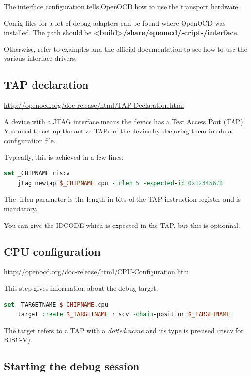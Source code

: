 \documentclass{article}
\begin{document}
    The interface configuration tells OpenOCD how to use the transport hardware. 
    
    Config files for a lot of debug adapters can be found where OpenOCD was installed. The path should be \textbf{<build>/share/openocd/scripts/interface}.
    
    Otherwise, refer to examples and the official documentation to see how to use the various interface drivers.
    
    \subsection{TAP declaration}
    
    \url{http://openocd.org/doc-release/html/TAP-Declaration.html}
    
    A device with a JTAG interface means the device has a Test Access Port (TAP). You need to set up the active TAPs of the device by declaring them inside a configuration file.
    
    Typically, this is achieved in a few lines:
    
    \begin{lstlisting}[language=tcl]
    set _CHIPNAME riscv
    jtag newtap $_CHIPNAME cpu -irlen 5 -expected-id 0x12345678
    \end{lstlisting}
    
    The -irlen parameter is the length in bits of the TAP instruction register and is mandatory.
    
    You can give the IDCODE which is expected in the TAP, but this is optionnal.
    
    \subsection{CPU configuration}
    
    \url{http://openocd.org/doc-release/html/CPU-Configuration.htm}
    
    This step gives information about the debug target.
    
    \begin{lstlisting}[language=tcl]
    set _TARGETNAME $_CHIPNAME.cpu
    target create $_TARGETNAME riscv -chain-position $_TARGETNAME
    \end{lstlisting}
    
    The target refers to a TAP with a \textit{dotted.name} and its type is precised (riscv for RISC-V).
    
    \subsection{Starting the debug session}
    
\end{document}
